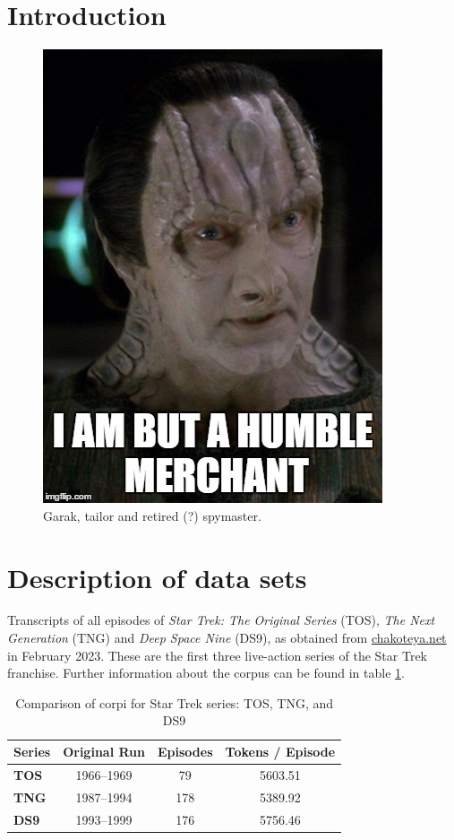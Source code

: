


\section{Introduction}
\label{sec:papertag.introduction}

\begin{figure}[tp!]
  \centering
    \includegraphics[width=0.5\columnwidth]{figures/localized/Garak.jpg}
  \caption{
    Garak, tailor and retired (?) spymaster.
  }
  \label{fig:papertag.}
\end{figure}

\section{Description of data sets}
\label{sec:papertag.data}

Transcripts of all episodes of \textit{Star Trek: The Original Series} (TOS), \textit{The Next Generation} (TNG) and \textit{Deep Space Nine} (DS9), as obtained from \href{http://chakoteya.net/StarTrek/index.html}{chakoteya.net} in February 2023. These are the first three live-action series of the Star Trek franchise. Further information about the corpus can be found in table \ref{table:series-comparison}.

\begin{table}
\centering
\begin{tabular}{l|c|c|c}
\textbf{Series} & \textbf{Original Run} & \textbf{Episodes} & \textbf{Tokens / Episode} \\
\hline
\textbf{TOS} & 1966--1969 & 79 & 5603.51 \\
\textbf{TNG} & 1987--1994 & 178 & 5389.92 \\
\textbf{DS9} & 1993--1999 & 176 & 5756.46 \\
\end{tabular}
\caption{Comparison of corpi for Star Trek series: TOS, TNG, and DS9}
\label{table:series-comparison}
\end{table}

